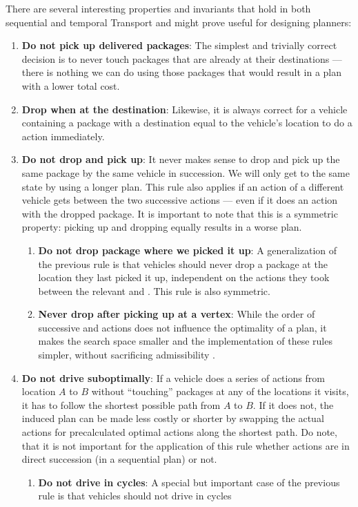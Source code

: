 There are several interesting properties and invariants that hold in both sequential and temporal Transport and might prove useful for designing planners:
\begin{enumerate}
\item \textbf{Do not pick up delivered packages}: The simplest and trivially correct decision is to never touch packages that are already at their destinations --- there is nothing
we can do using those packages that would result in a plan with a lower total cost.

\item \textbf{Drop when at the destination}: Likewise, it is
always correct for a vehicle containing a package with a destination equal
to the vehicle's location to do a \drop{} action immediately.

\item \textbf{Do not drop and pick up}: It never makes sense to drop and pick up
the same package by the same vehicle in succession. We will only get to the same state
by using a longer plan. This rule also applies if an action of a different vehicle
gets between the two successive actions --- even if it does an action with the
dropped package.
It is important to note that this is a symmetric property: picking up and dropping
equally results in a worse plan.
\begin{enumerate}
\item \textbf{Do not drop package where we picked it up}: A generalization
of the previous rule is that vehicles should never drop a package
at the location they last picked it up, independent on the actions they took
between the relevant \pickup{} and \drop{}. This rule is also symmetric.

\item \textbf{Never drop after picking up at a vertex}:
While the order of successive \pickup{} and \drop{} actions does not
influence the optimality of a plan, it makes the search space smaller and the implementation of these rules simpler,
without sacrificing admissibility .
\end{enumerate}

\item \textbf{Do not drive suboptimally}: If a vehicle does a series of
\drive{} actions from location $A$ to $B$ without ``touching'' packages at any of the locations it visits,
it has to follow the shortest possible path from $A$ to $B$. If it does not,
the induced plan can be made less costly or shorter by swapping the actual \drive{} actions
for precalculated optimal \drive{} actions along the shortest path.
Do note, that it is not important for the application of this rule whether actions are in direct succession (in a sequential plan) or not.
\begin{enumerate}
\item \textbf{Do not drive in cycles}: A special but important case of the previous rule is that vehicles should not drive in cycles
\end{enumerate}


\end{enumerate}
